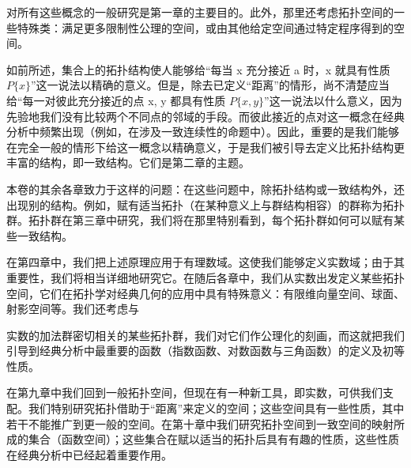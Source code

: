 对所有这些概念的一般研究是第一章的主要目的。此外，那里还考虑拓扑空间的一些特殊类：满足更多限制性公理的空间，或由其他给定空间通过特定程序得到的空间。

如前所述，集合上的拓扑结构使人能够给“每当 x 充分接近 a 时，x 就具有性质 \(P\{x\}\)”这一说法以精确的意义。但是，除去已定义“距离”的情形，尚不清楚应当给“每一对彼此充分接近的点 x, y 都具有性质 \(P\{x, y\}\)”这一说法以什么意义，因为先验地我们没有比较两个不同点的邻域的手段。而彼此接近的点对这一概念在经典分析中频繁出现（例如，在涉及一致连续性的命题中）。因此，重要的是我们能够在完全一般的情形下给这一概念以精确意义，于是我们被引导去定义比拓扑结构更丰富的结构，即一致结构。它们是第二章的主题。

本卷的其余各章致力于这样的问题：在这些问题中，除拓扑结构或一致结构外，还出现别的结构。例如，赋有适当拓扑（在某种意义上与群结构相容）的群称为拓扑群。拓扑群在第三章中研究，我们将在那里特别看到，每个拓扑群如何可以赋有某些一致结构。

在第四章中，我们把上述原理应用于有理数域。这使我们能够定义实数域；由于其重要性，我们将相当详细地研究它。在随后各章中，我们从实数出发定义某些拓扑空间，它们在拓扑学对经典几何的应用中具有特殊意义：有限维向量空间、球面、射影空间等。我们还考虑与

实数的加法群密切相关的某些拓扑群，我们对它们作公理化的刻画，而这就把我们引导到经典分析中最重要的函数（指数函数、对数函数与三角函数）的定义及初等性质。

在第九章中我们回到一般拓扑空间，但现在有一种新工具，即实数，可供我们支配。我们特别研究拓扑借助于“距离”来定义的空间；这些空间具有一些性质，其中若干不能推广到更一般的空间。在第十章中我们研究拓扑空间到一致空间的映射所成的集合（函数空间）；这些集合在赋以适当的拓扑后具有有趣的性质，这些性质在经典分析中已经起着重要作用。

